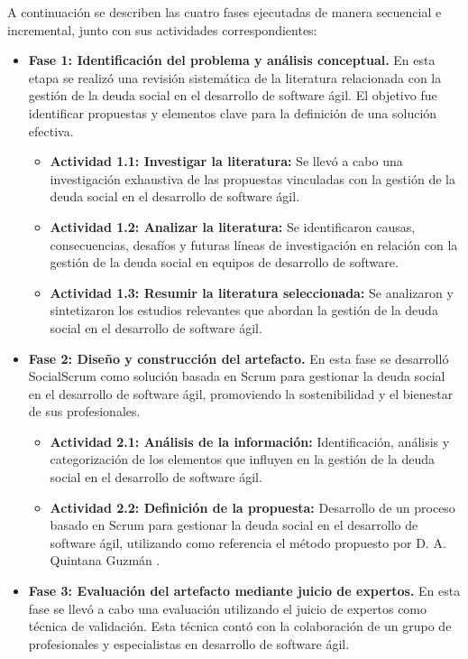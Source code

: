 A continuación se describen las cuatro fases ejecutadas de manera secuencial e incremental, junto con sus actividades correspondientes:
\begin{itemize}
    \item \textbf{Fase 1: Identificación del problema y análisis conceptual.} En esta etapa se realizó una revisión sistemática de la literatura relacionada con la gestión de la deuda social en el desarrollo de software ágil. El objetivo fue identificar propuestas y elementos clave para la definición de una solución efectiva.
          \begin{itemize}
              \item \textbf{Actividad 1.1: Investigar la literatura:} Se llevó a cabo una investigación exhaustiva de las propuestas vinculadas con la gestión de la deuda social en el desarrollo de software ágil.
              \item \textbf{Actividad 1.2: Analizar la literatura:} Se identificaron causas, consecuencias, desafíos y futuras líneas de investigación en relación con la gestión de la deuda social en equipos de desarrollo de software.
              \item \textbf{Actividad 1.3: Resumir la literatura seleccionada:} Se analizaron y sintetizaron los estudios relevantes que abordan la gestión de la deuda social en el desarrollo de software ágil.
          \end{itemize}
    \item \textbf{Fase 2: Diseño y construcción del artefacto.} En esta fase se desarrolló SocialScrum como solución basada en Scrum para gestionar la deuda social en el desarrollo de software ágil, promoviendo la sostenibilidad y el bienestar de sus profesionales.
          \begin{itemize}
              \item \textbf{Actividad 2.1: Análisis de la información:} Identificación, análisis y categorización de los elementos que influyen en la gestión de la deuda social en el desarrollo de software ágil.
              \item \textbf{Actividad 2.2: Definición de la propuesta:} Desarrollo de un proceso basado en Scrum para gestionar la deuda social en el desarrollo de software ágil, utilizando como referencia el método propuesto por D. A. Quintana Guzmán \cite{quintana2017metodo}.
          \end{itemize}
    \item \textbf{Fase 3: Evaluación del artefacto mediante juicio de expertos.} En esta fase se llevó a cabo una evaluación utilizando el juicio de expertos como técnica de validación. Esta técnica contó con la colaboración de un grupo de profesionales y especialistas en desarrollo de software ágil.

\end{itemize}
